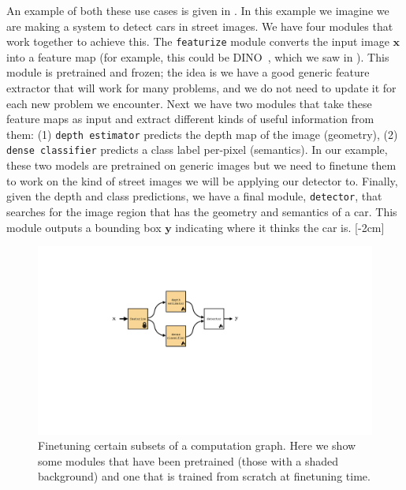 An example of both these use cases is given in \fig{\ref{fig:transfer_learning:finetuning_certain_modules_example}}. In this example we imagine we are making a system to detect cars in street images. We have four modules that work together to achieve this. The \texttt{featurize} module converts the input image $\mathbf{x}$ into a feature map (for example, this could be DINO~\cite{caron2021emerging}, which we saw in \sect{\ref{sec:perceptual_organization:affinity_based_segmentation}}). This module is pretrained and frozen; the idea is we have a good generic feature extractor that will work for many problems, and we do not need to update it for each new problem we encounter. Next we have two modules that take these feature maps as input and extract different kinds of useful information from them: (1) \texttt{depth estimator} predicts the depth map of the image (geometry), (2) \texttt{dense classifier} predicts a class label per-pixel (semantics). In our example, these two models are pretrained on generic images but we need to finetune them to work on the kind of street images we will be applying our detector to. Finally, given the depth and class predictions, we have a final module, \texttt{detector}, that searches for the image region that has the geometry and semantics of a car. This module outputs a bounding box $\mathbf{y}$ indicating where it thinks the car is.
[-2cm]
\begin{figure}[h]
    \centerline{
    \includegraphics[width=0.7\linewidth]{./figures/transfer_learning/finetuning_certain_modules_example.pdf}
    }
    \caption{Finetuning certain subsets of a computation graph. Here we show some modules that have been pretrained (those with a shaded background) and one that is trained from scratch at finetuning time.}
    \label{fig:transfer_learning:finetuning_certain_modules_example}
\end{figure}

